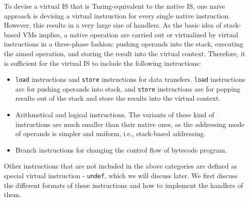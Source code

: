 To devise a virtual IS that is Turing-equivalent to the native IS, one naive approach is devising a virtual instruction for every single native instruction. However, this results in a very large size of handlers. As the basic idea of stack-based VMs implies, a native operation are carried out or virtualized by virtual instructions in a three-phase fashion: pushing operands into the stack, executing the aimed operation, and storing the result into the virtual context. Therefore, it is sufficient for the virtual IS to include the following instructions:
\begin{itemize}
  \item \texttt{load} instructions and \texttt{store} instructions for data transfers. \texttt{load} instructions are for pushing operands into stack, and \texttt{store} instructions are for popping results out of the stack and store the results into the virtual context.
  \item Arithmetical and logical instructions. The variants of these kind of instructions are much smaller than their native ones, as the addressing mode of operands is simpler and uniform, i.e., stack-based addressing.
  \item Branch instructions for changing the control flow of bytecode program.
\end{itemize}

Other instructions that are not included in the above categories are defined as special virtual instruction - \texttt{undef}, which we will discuss later. We first discuss the different formats of these instructions and how to implement the handlers of them.

